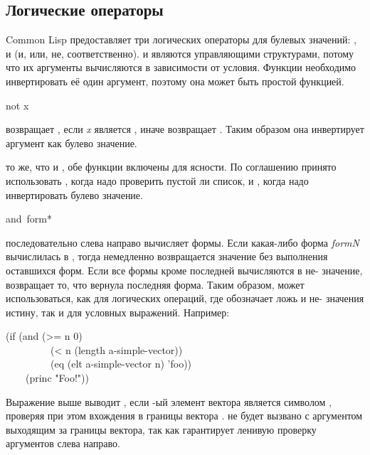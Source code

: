 \begin{defun}[Функция]
\section{Логические операторы}

Common Lisp предоставляет три логических операторы для булевых значений:
,  и  (и, или, не, соответственно).  и
 являются управляющими структурами, потому что их аргументы
вычисляются в зависимости от условия.
Функции  необходимо инвертировать её один аргумент, поэтому она может
быть простой функцией.

\begin{defun}[Функция]
not x

 возвращает {\true}, если \emph{x} является {\false}, иначе
возвращает {\false}.
Таким образом она инвертирует аргумент как булево значение.

 то же, что и , обе функции включены для ясности. По
соглашению принято использовать , когда надо проверить пустой ли
список, и , когда надо инвертировать булево значение.
\end{defun}

\begin{defmac}
and {\,form}*

 последовательно слева направо
вычисляет формы. Если какая-либо форма \emph{formN} вычислилась в {\false},
тогда немедленно возвращается значение {\nil} без выполнения оставшихся форм. Если все
формы кроме последней вычисляются в не-{\false} значение,  возвращает
то, что вернула последняя форма.
Таким образом,  может использоваться, как для логических операций, где
{\false} обозначает ложь и не-{\false} значения истину, так и для условных
выражений.
Например:
\begin{lisp}
(if (and (>= n 0) \\
~~~~~~~~~(< n (length a-simple-vector)) \\
~~~~~~~~~(eq (elt a-simple-vector n) 'foo)) \\
~~~~(princ "Foo!"))
\end{lisp}
Выражение выше выводит , если -ый элемент вектора
 является символом , проверяя при этом вхождения
 в границы вектора .  не будет вызвано с
аргументом  выходящим за границы вектора, так как  гарантирует
ленивую проверку аргументов слева направо.


\end{defmac}
\end{defun}
